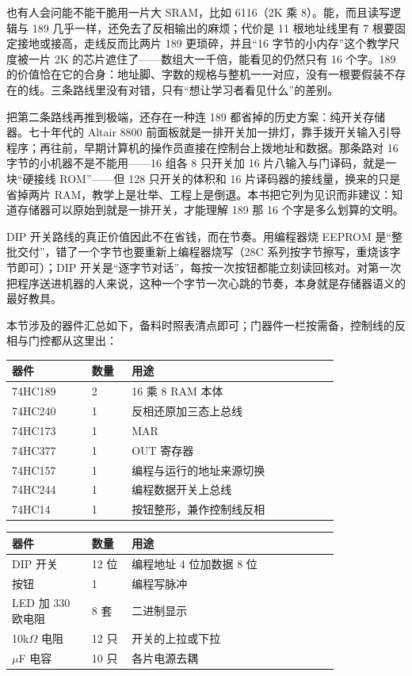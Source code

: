 也有人会问能不能干脆用一片大 SRAM，比如 6116（2K 乘 8）。能，而且读写逻辑与 189 几乎一样，还免去了反相输出的麻烦；代价是 11 根地址线里有 7 根要固定接地或接高，走线反而比两片 189 更琐碎，并且“16 字节的小内存”这个教学尺度被一片 2K 的芯片遮住了——数组大一千倍，能看见的仍然只有 16 个字。189 的价值恰在它的合身：地址脚、字数的规格与整机一一对应，没有一根要假装不存在的线。三条路线里没有对错，只有“想让学习者看见什么”的差别。

把第二条路线再推到极端，还存在一种连 189 都省掉的历史方案：纯开关存储器。七十年代的 Altair 8800 前面板就是一排开关加一排灯，靠手拨开关输入引导程序；再往前，早期计算机的操作员直接在控制台上拨地址和数据。那条路对 16 字节的小机器不是不能用——16 组各 8 只开关加 16 片八输入与门译码，就是一块“硬接线 ROM”——但 128 只开关的体积和 16 片译码器的接线量，换来的只是省掉两片 RAM，教学上是壮举、工程上是倒退。本书把它列为见识而非建议：知道存储器可以原始到就是一排开关，才能理解 189 那 16 个字是多么划算的文明。

DIP 开关路线的真正价值因此不在省钱，而在节奏。用编程器烧 EEPROM 是“整批交付”，错了一个字节也要重新上编程器烧写（28C 系列按字节擦写，重烧该字节即可）；DIP 开关是“逐字节对话”，每按一次按钮都能立刻读回核对。对第一次把程序送进机器的人来说，这种一个字节一次心跳的节奏，本身就是存储器语义的最好教具。

本节涉及的器件汇总如下，备料时照表清点即可；门器件一栏按需备，控制线的反相与门控都从这里出：

\begin{longtable}{L{0.20\linewidth}L{0.10\linewidth}L{0.52\linewidth}}
\toprule
器件 & 数量 & 用途 \\
\midrule
74HC189 & 2 & 16 乘 8 RAM 本体 \\\tablerowrule
74HC240 & 1 & 反相还原加三态上总线 \\\tablerowrule
74HC173 & 1 & MAR \\\tablerowrule
74HC377 & 1 & OUT 寄存器 \\\tablerowrule
74HC157 & 1 & 编程与运行的地址来源切换 \\\tablerowrule
74HC244 & 1 & 编程数据开关上总线 \\\tablerowrule
74HC14 & 1 & 按钮整形，兼作控制线反相 \\
\bottomrule
\end{longtable}

\begin{longtable}{L{0.20\linewidth}L{0.10\linewidth}L{0.52\linewidth}}
\toprule
器件 & 数量 & 用途 \\
\midrule
DIP 开关 & 12 位 & 编程地址 4 位加数据 8 位 \\\tablerowrule
按钮 & 1 & 编程写脉冲 \\\tablerowrule
LED 加 330 欧电阻 & 8 套 & 二进制显示 \\\tablerowrule
10k$\Omega$ 电阻 & 12 只 & 开关的上拉或下拉 \\$\mu$F 电容 & 10 只 & 各片电源去耦 \\
\bottomrule
\end{longtable}

